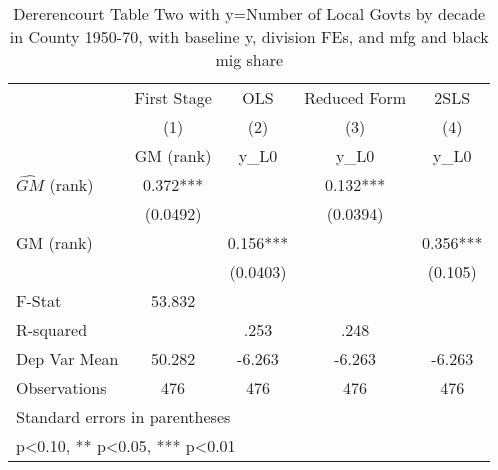 \begin{table}[htbp]\centering
\def\sym#1{\ifmmode^{#1}\else\(^{#1}\)\fi}
\caption{Dererencourt Table Two with y=Number of Local Govts by decade in County 1950-70, with baseline y, division FEs, and mfg and black mig share}
\begin{tabular}{l*{4}{c}}
\toprule
                    & First Stage   &         OLS   &Reduced Form   &        2SLS   \\
                    &\multicolumn{1}{c}{(1)}&\multicolumn{1}{c}{(2)}&\multicolumn{1}{c}{(3)}&\multicolumn{1}{c}{(4)}\\
                    &\multicolumn{1}{c}{GM  (rank)}&\multicolumn{1}{c}{y\_L0}&\multicolumn{1}{c}{y\_L0}&\multicolumn{1}{c}{y\_L0}\\
\midrule
$\hat{GM}$ (rank)   &       0.372***&               &       0.132***&               \\
                    &    (0.0492)   &               &    (0.0394)   &               \\
\addlinespace
GM  (rank)          &               &       0.156***&               &       0.356***\\
                    &               &    (0.0403)   &               &     (0.105)   \\
\midrule
F-Stat              &      53.832   &               &               &               \\
R-squared           &               &        .253   &        .248   &               \\
Dep Var Mean        &      50.282   &      -6.263   &      -6.263   &      -6.263   \\
Observations        &         476   &         476   &         476   &         476   \\
\bottomrule
\multicolumn{5}{l}{\footnotesize Standard errors in parentheses}\\
\multicolumn{5}{l}{\footnotesize * p<0.10, ** p<0.05, *** p<0.01}\\
\end{tabular}
\end{table}

